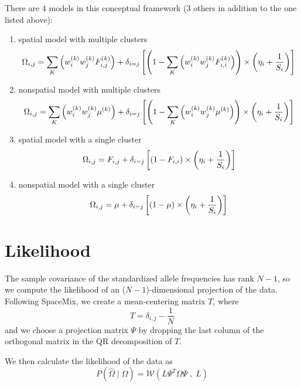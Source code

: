 \documentclass[12pt]{article}
\begin{document}
There are 4 models in this conceptual framework (3 others in addition to the one listed above):
\begin{enumerate}
\item spatial model with multiple clusters
	\begin{equation}
	\Omega_{i,j} = \sum\limits_K \left(	w^{(k)}_iw^{(k)}_j F^{(k)}_{i,j} \right) + 
		\delta_{i=j} \left[
			\left(1-\sum\limits_K \left(	w^{(k)}_iw^{(k)}_j F^{(k)}_{i,i}\right)\right) \times 
			\left( \eta_i + \frac{1}{S_i} \right)
				\right] \notag
	\end{equation}
\item nonspatial model with multiple clusters
	\begin{equation}
	\Omega_{i,j} = \sum\limits_K \left(	w^{(k)}_iw^{(k)}_j \mu^{(k)} \right) + 
		\delta_{i=j} \left[
			\left(1-\sum\limits_K \left(	w^{(k)}_iw^{(k)}_j \mu^{(k)}\right)\right) \times 
			\left( \eta_i + \frac{1}{S_i} \right)
				\right] \notag
	\end{equation}
\item spatial model with a single cluster
	\begin{equation}
	\Omega_{i,j} = F_{i,j}  + 
		\delta_{i=j} \left[
			\left(1-F_{i,i}\right) \times 
			\left( \eta_i + \frac{1}{S_i} \right)
				\right] \notag
	\end{equation}
\item nonspatial model with a single cluster
	\begin{equation}
	\Omega_{i,j} = \mu + 
		\delta_{i=j} \left[
			\left(1-\mu \right) \times 
			\left( \eta_i + \frac{1}{S_i} \right)
				\right] \notag
	\end{equation}
\end{enumerate}

\newpage
\section{Likelihood}
The sample covariance of the standardized allele frequencies has rank $N-1$, 
so we compute the likelihood of an ($N-1$)-dimensional projection of the data.
Following SpaceMix, we create a mean-centering matrix $T$, where 
\begin{equation}
T = \delta_{i,j} - \frac{1}{N}
\label{mc_matrix}
\end{equation}
and we choose a projection matrix $\Psi$ by dropping the last column 
of the orthogonal matrix in the QR decomposition of $T$.

We then calculate the likelihood of the data as
\begin{equation}
P(\widehat{\Omega} \; | \; \Omega) = \mathcal{W}(L\Psi^T \Omega \Psi \; , \; L)
\label{likelihood}
\end{equation} 
\end{document}

